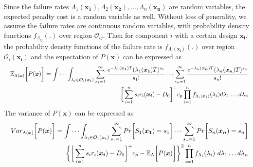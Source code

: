 \documentclass[preprint,12pt]{elsarticle}
\begin{document}
Since the failure rates $\Lambda_{1}(\boldsymbol{x_{1}}),\Lambda_{2}(\boldsymbol{x_{2}}),...,\Lambda_{n}(\boldsymbol{x_{n}})$ are random variables, the expected penalty cost is a random variable as well. Without loss of generality, we assume the failure rates are continuous random variables, with probability density functions $f_{\Lambda_{ij}}(.)$ over region $\mathcal{O}_{ij}$. Then for component $i$ with a certain design $\boldsymbol{x_{i}}$, the probability density functions of the failure rate is $f_{\Lambda_{i}(\boldsymbol{x_{i}})}(.)$ over region $\mathcal{O}_{i}(\boldsymbol{x_{i}})$ and the expectation of $P(\boldsymbol{x})$ can be expressed as
\begin{eqnarray}
&& \mathbb{E}_{\Lambda(\boldsymbol{x})} \bigg[P(\boldsymbol{x}) \bigg]=
\idotsint_{\lambda_{i} \in \mathcal{O}_{i}(\boldsymbol{x_i})} \sum_{s_{1}=1}^{\infty}{ \frac{e^{-\lambda_{1}(\boldsymbol{x_{1}})T}(\lambda_{1}(\boldsymbol{x_{1}})T)^{s_{1}}}{s_{1}!}}\dots\sum_{s_{n}=1}^{\infty}{\frac{e^{-\lambda_{n}(\boldsymbol{x_{n}})T}(\lambda_{n}(\boldsymbol{x_{n}})T)^{s_{n}}}{s_{n}!}} \nonumber\\
 &&\bigg[\sum_{i=1}^{n}{s_{i}r_{i}(\boldsymbol{x_{i}})}-D_{0}\bigg]^{+}c_{p}\prod_{i=1}^{n}{f_{\Lambda_{i}(\boldsymbol{x_{i}})}(\lambda_{i})d\lambda_{1}\dots d\lambda_{n}} \label{EP2}
\end{eqnarray}
The variance of $P(\boldsymbol{x})$ can be expressed as
\begin{eqnarray}
&&Var_{\Lambda(\boldsymbol{x})} \bigg[ P(\boldsymbol{x}) \bigg]=
\idotsint_{\lambda_{i} \in \mathcal{O}_{i}(\boldsymbol{x_{i}})} \sum_{s_{1}=1}^{\infty}{ Pr\bigg[S_{1}(\boldsymbol{x_{1}})=s_{1}\bigg]}\dots\sum_{s_{n}=1} ^{\infty}{Pr\bigg[S_{n}(\boldsymbol{x_{n}})=s_{n}\bigg]}\nonumber\\
&&\bigg\{\bigg[\sum_{i=1}^{n}{s_{i}r_{i}(\boldsymbol{x_{i}})}-D_{0}\bigg]^{+}c_{p} -\mathbb{E}_{\Lambda} \bigg[ P(\boldsymbol{x}) \bigg]\bigg\}^{2} \prod_{i=1}^{n} f_{\Lambda_{i}}(\lambda_{i}) \ d\lambda_{1}\dots d\lambda_{n}
\end{eqnarray}
\end{document}
